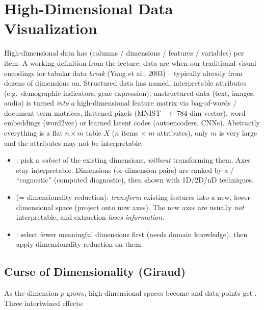 \section{High-Dimensional Data Visualization}

High-dimensional data has  (columns / dimensions / features /
variables) per item. A working definition from the lecture: data are
 when our traditional visual encodings for tabular data
\emph{break} (Yang et al., 2003) -- typically already from dozens of dimensions
on. Structured data has named, interpretable attributes (e.g.\ demographic
indicators, gene expression); unstructured data (text, images, audio) is turned
\emph{into} a high-dimensional feature matrix via bag-of-words /
document-term matrices, flattened pixels (MNIST $\to$ $784$-dim vector),
word embeddings (word2vec) or learned latent codes (autoencoders, CNNs).
Abstractly everything is a flat $n \times m$ table $X$ ($n$ items $\times$ $m$
attributes), only $m$ is very large and the attributes may not be interpretable.

\begin{keybox}
\begin{itemize}
\item {}: pick a \emph{subset} of the existing dimensions,
      \emph{without} transforming them. Axes stay interpretable. Dimensions (or
      dimension pairs) are ranked by a  / ``cognostic''
      (computed diagnostic), then shown with 1D/2D/nD techniques.
\item {} (= dimensionality reduction): \emph{transform}
      existing features into a new, lower-dimensional space (project onto new
      axes). The new axes are usually \emph{not} interpretable, and extraction
      \emph{loses information}.
\item {}: select fewer meaningful dimensions first (needs domain
      knowledge), then apply dimensionality reduction on them.
\end{itemize}
\end{keybox}

\subsection{Curse of Dimensionality (Giraud)}

As the dimension $p$ grows, high-dimensional spaces become  and data
points get . Three intertwined effects:

